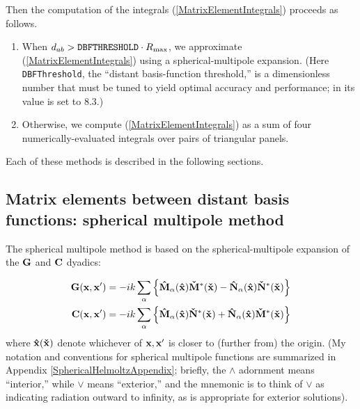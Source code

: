 \documentclass[letterpaper]{article}
\begin{document}
Then the computation of the integrals (\ref{MatrixElementIntegrals})
proceeds as follows. 

\begin{enumerate}
 \item
 When $d_{ab} > \texttt{DBFTHRESHOLD}\cdot R_{\hbox{\scriptsize{max}}}$,
 we approximate (\ref{MatrixElementIntegrals}) using a 
 spherical-multipole expansion. 
 (Here \texttt{DBFThreshold}, the ``distant basis-function threshold,''
 is a dimensionless number that must be tuned to yield 
 optimal accuracy and performance; in \lss its value is set to 8.3.)
 \item
 Otherwise, we compute (\ref{MatrixElementIntegrals}) as a sum
 of four numerically-evaluated integrals over pairs of triangular
 panels.
\end{enumerate}

Each of these methods is described in the following sections.

\subsection{Matrix elements between distant basis functions: 
            spherical multipole method}
\label{SphericalMultipoleMatrixElementSection}

The spherical multipole method is based on the spherical-multipole
expansion of the $\mathbf{G}$ and $\mathbf{C}$ dyadics:

\begin{align*}
 \mathbf{G}(\mathbf{x}, \mathbf{x}^\prime)
 &= -ik\sum_{\alpha} 
      \left\{   \mathbf{\hat M}_{\alpha}(\mathbf{\hat x})\mathbf{\check M}^*(\mathbf{\check x})
              - \mathbf{\hat N}_{\alpha}(\mathbf{\hat x})\mathbf{\check N}^*(\mathbf{\check x})
      \right\} 
\\
 \mathbf{C}(\mathbf{x}, \mathbf{x}^\prime)
 &= -ik\sum_{\alpha} 
      \left\{   \mathbf{\hat M}_{\alpha}(\mathbf{\hat x})\mathbf{\check N}^*(\mathbf{\check x}) 
              + \mathbf{\hat N}_{\alpha}(\mathbf{\hat x})\mathbf{\check M}^*(\mathbf{\check x})
      \right\} 
\end{align*}
where $\mathbf{\hat x} (\mathbf{\check x})$ denote whichever of $\mathbf{x}, \mathbf{x}^\prime$
is closer to (further from) the origin.
(My notation and conventions for spherical multipole functions
are summarized in Appendix \ref{SphericalHelmoltzAppendix}; 
briefly, the $\wedge$ adornment means ``interior,'' 
while $\vee$ means ``exterior,'' and the mnemonic is to 
think of $\vee$ as indicating radiation outward to infinity,
as is appropriate for exterior solutions).
\end{document}
